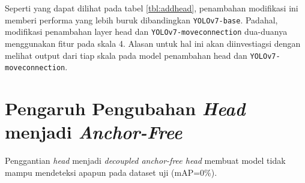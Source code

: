 
Seperti yang dapat dilihat pada tabel \ref{tbl:addhead}, penambahan modifikasi ini memberi performa 
yang lebih buruk dibandingkan \verb*|YOLOv7-base|. 
Padahal, modifikasi penambahan layer head dan \verb*|YOLOv7-moveconnection| dua-duanya menggunakan fitur pada skala 4.
Alasan untuk hal ini akan diinvestiagsi dengan melihat output dari tiap skala pada model penambahan head dan \verb*|YOLOv7-moveconnection|.

\section{Pengaruh Pengubahan \emph{Head} menjadi \emph{Anchor-Free}}
Penggantian \emph{head} menjadi \emph{decoupled anchor-free head} membuat model tidak mampu mendeteksi apapun pada dataset uji (mAP=0\%).


